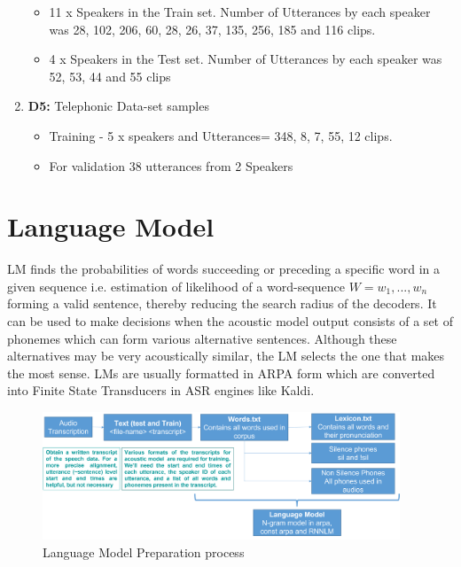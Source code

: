 \begin{enumerate}
    \begin{itemize}
        \item 11 x Speakers in the Train set. Number of Utterances by each speaker was 28, 102, 206, 60, 28, 26, 37, 135, 256, 185 and 116 clips.
        \item 4 x Speakers in the Test set. Number of Utterances by each speaker was 52, 53, 44 and 55 clips 
    \end{itemize}
    \item \textbf{D5:} Telephonic Data-set samples  
    \begin{itemize}
        \item Training - 5 x speakers and Utterances= 348, 8, 7, 55, 12 clips.
        \item For validation 38 utterances from 2 Speakers
    \end{itemize}
\end{enumerate}

\section{Language Model}
\label{sec:our_lang_modelling}

LM finds the probabilities of words succeeding or preceding a specific word in a given sequence i.e. estimation of likelihood of a word-sequence $W = w_{1},...,w_{n}$ forming a valid sentence, thereby reducing the search radius of the decoders. It can be used to make decisions when the acoustic model output consists of a set of phonemes which can form various alternative sentences. Although these alternatives may be very acoustically similar, the LM selects the one that makes the most sense. LMs are usually formatted in ARPA form which are converted into Finite State Transducers in ASR engines like Kaldi.

\begin{figure}[htb]
    \centering
    \includegraphics[width=0.95\textwidth]{img/LM.png}
    \caption{Language Model Preparation process}
    \label{fig:lang-model1}
\end{figure}

